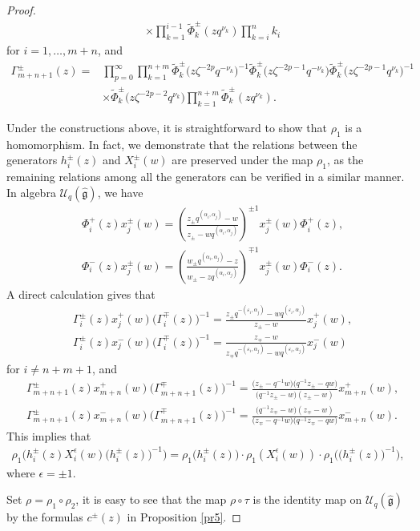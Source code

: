 \documentclass[pdftex]{sigma}
\numberwithin{equation}{section}
\begin{document}
\begin{proof}
\begin{align*}
 &\times\prod\limits_{k=1}^{i-1}\widetilde{\Phi}^{\pm}_{k}(z q^{\nu_k})\prod\limits_{k=i}^{n}k_i
\end{align*}
for $i=1,\dots,m+n$, and
\begin{align*}
 \Gamma_{m+n+1}^{\pm}(z)={}&\prod\limits_{p=0}^{\infty}\prod\limits_{k=1}^{n+m}\widetilde{\Phi}^{\pm}_{k}\bigl(z\zeta^{-2p} q^{-\nu_k}\bigr)^{-1}\widetilde{\Phi}^{\pm}_{k}\bigl(z\zeta^{-2p-1} q^{-\nu_k}\bigr)\widetilde{\Phi}^{\pm}_{k}\bigl(z\zeta^{-2p-1} q^{\nu_k}\bigr)^{-1}\\
 &\times\widetilde{\Phi}^{\pm}_{k}\bigl(z\zeta^{-2p-2} q^{\nu_k}\bigr)
 \prod\limits_{k=1}^{n+m}\widetilde{\Phi}^{\pm}_{k}(z q^{\nu_k}).
\end{align*}

Under the constructions above, it is straightforward to show that $\rho_1$ is a homomorphism. In fact,
we demonstrate that the relations between the generators $h_i^{\pm}(z)$ and $X_i^{\pm}(w)$ are preserved under the map $\rho_1$, as the remaining relations among all the generators can be verified in a similar manner.
In algebra $\mathcal{U}_q(\mathfrak{\hat{g}})$, we have
\begin{align*}
 &\Phi^{+}_i(z)x_j^{\pm}(w)=\left(\frac{z_{\pm}q^{(\alpha_i,\alpha_j)}-w}{z_{\pm}-wq^{(\alpha_i,\alpha_j)}}\right)^{\pm1}x_j^{\pm}(w)\Phi^{+}_i(z),\\
 & \Phi^{-}_i(z)x_j^{\pm}(w)=\left(\frac{w_{\pm}q^{(\alpha_i,\alpha_j)}-z}{w_{\pm}-zq^{(\alpha_i,\alpha_j)}}\right)^{\mp1}x_j^{\pm}(w)\Phi^{-}_i(z).
\end{align*}A direct calculation gives that
\begin{align*}
 &\Gamma_i^{\pm}(z)x_j^{+}(w)\bigl(\Gamma_i^{\mp}(z)\bigr)^{-1}=\frac{z_{\pm}q^{-(\varepsilon_i,\alpha_j)}-wq^{(\varepsilon_i,\alpha_j)}}{z_{\pm}-w}
 x_j^{+}(w),\\
 &\Gamma_i^{\pm}(z)x_j^{-}(w)\bigl(\Gamma_i^{\mp}(z)\bigr)^{-1}=\frac{z_{\mp}-w}{z_{\mp}q^{-(\varepsilon_i,\alpha_j)}-wq^{(\varepsilon_i,\alpha_j)}}
 x_j^{-}(w)
\end{align*}for $i\neq n+m+1$, and
\begin{align*}
 &\Gamma_{m+n+1}^{\pm}(z)x_{m+n}^+(w)\bigl(\Gamma_{m+n+1}^{\mp}(z)\bigr)^{-1}=\frac{\bigl(z_{\pm}-q^{-1}w\bigr)\bigl(q^{-1}z_{\pm}-qw\bigr)}{\bigl(q^{-1}z_{\pm}-w\bigr)(z_{\pm}-w)}x_{m+n}^+(w),\\
 &\Gamma_{m+n+1}^{\pm}(z)x_{m+n}^-(w)\bigl(\Gamma_{m+n+1}^{\mp}(z)\bigr)^{-1}=\frac{\bigl(q^{-1}z_{\mp}-w\bigr)(z_{\mp}-w)}{\bigl(z_{\mp}-q^{-1}w\bigr)\bigl(q^{-1}z_{\mp}-qw\bigr)}x_{m+n}^-(w).
\end{align*}This implies that
\begin{gather*}
 \rho_1\bigl(h_i^{\pm}(z)X_i^{\epsilon}(w)\bigl(h_i^{\pm}(z)\bigr)^{-1}\bigr)=\rho_1\bigl(h_i^{\pm}(z)\bigr)\cdot\rho_1(X_i^{\epsilon}(w))\cdot\rho_1\bigl(\bigl(h_i^{\pm}(z)\bigr)^{-1}\bigr),
\end{gather*}where $\epsilon=\pm1$.

Set $\rho=\rho_1\circ\rho_2$, it is easy to see that the map $\rho\circ\tau$ is the identity map on $\mathcal{U}_q(\mathfrak{\hat{g}})$ by the formulas $c^{\pm}(z)$ in Proposition \ref{pr5}.
\end{proof}
\end{document}
